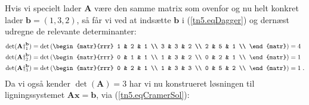 \begin{exercise}
Hvis vi specielt lader $\mathbf{A}$ være den samme matrix som ovenfor og nu helt konkret lader $\mathbf{b} = (1,3,2)$, så får vi ved at indsætte $\mathbf{b}$ i (\ref{tn5.eqDagger}) og dernæst udregne de relevante determinanter:
\begin{equation}
\begin{aligned}
\det(\mathbf{A}\dag_{\small{1}}^{\mathbf{b}}) &= \det\left(\begin{matr}{rrr}
                                                               1 & 2 & 1 \\
                                                               3 & 3 & 2 \\
                                                               2 & 5 & 1 \\
                                                             \end{matr} \right) =  4 \\
\det(\mathbf{A}\dag_{\small{2}}^{\mathbf{b}}) &= \det\left(\begin{matr}{rrr}
                                                               0 & 1 & 1 \\
                                                               1 & 3 & 2 \\
                                                               0 & 2 & 1 \\
                                                             \end{matr} \right) = 1 \\
\det(\mathbf{A}\dag_{\small{3}}^{\mathbf{b}}) &= \det\left(\begin{matr}{rrr}
                                                               0 & 2 & 1 \\
                                                               1 & 3 & 3 \\
                                                               0 & 5 & 2 \\
                                                             \end{matr} \right) = 1\;.
\end{aligned}
\end{equation}
Da vi også kender $\det(\mathbf{A}) = 3$ har vi nu konstrueret løsningen til ligningssystemet $\mathbf{A}\mathbf{x} = \mathbf{b}$, via (\ref{tn5.eqCramerSol}):
\begin{equation}

\end{equation}
\end{exercise}
